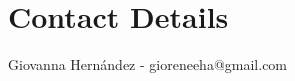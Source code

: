 \documentclass[a1,portrait]{a1poster}
\begin{document}
\begin{multicols}{2}

\begin{small}%
\begin{multicols}{2}%
\end{multicols}
\end{small}
\section*{Contact Details}
Giovanna Hernández - gioreneeha@gmail.com
\end{multicols}
\end{document}
